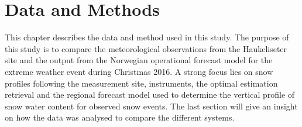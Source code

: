\chapter{Data and Methods}\label{ch:Methods}

This chapter describes the data and method used in this study. 
The purpose of this study is to compare the meteorological observations from the Haukeliseter site and the output from the Norwegian operational forecast model %
for the extreme weather event during Christmas 2016. 
A strong focus lies on snow profiles following the measurement site, instruments, the optimal estimation retrieval and the regional forecast model used to determine the vertical profile of snow water content for observed snow events. 
The last section will give an insight on how the data was analysed to compare the different systems. 









